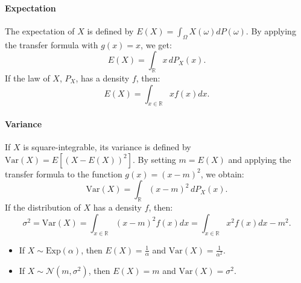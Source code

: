 \paragraph{Expectation}
The expectation of $X$ is defined by $E(X) = \int_{\Omega} X(\omega) dP(\omega)$. By applying the transfer formula with $g(x) = x$, we get:
\[
E(X) = \int_{\mathbb{R}} x \,dP_X(x).
\]
If the law of $X$, $P_X$, has a density $f$, then:
\[
E(X) = \int_{x \in \mathbb{R}} x f(x) dx.
\]
\paragraph{Variance}
If $X$ is square-integrable, its variance is defined by $\text{Var}(X) = E[(X-E(X))^2]$. By setting $m=E(X)$ and applying the transfer formula to the function%
$g(x) = (x-m)^2$, we obtain:
\[
\text{Var}(X) = \int_{\mathbb{R}} (x-m)^2 \,dP_X(x).
\]
If the distribution of $X$ has a density $f$, then:
\[
\sigma^2 = \text{Var}(X) = \int_{x \in \mathbb{R}} (x-m)^2 f(x) dx = \int_{x \in \mathbb{R}} x^2 f(x) dx - m^2.
\]%
\begin{example}
\begin{itemize}
    \item If $X \sim \text{Exp}(\alpha)$, then $E(X) = \frac{1}{\alpha}$ and $\text{Var}(X) = \frac{1}{\alpha^2}$.
    \item If $X \sim \mathcal{N}(m, \sigma^2)$, then $E(X) = m$ and $\text{Var}(X) = \sigma^2$.
\end{itemize}
\end{example}%
